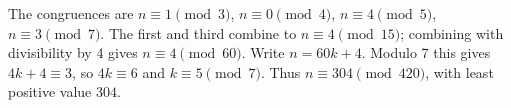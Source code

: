 The congruences are $n\equiv 1\pmod 3$, $n\equiv 0\pmod 4$, $n\equiv 4\pmod 5$, $n\equiv 3\pmod 7$. The first and third combine to $n\equiv 4\pmod{15}$; combining with divisibility by 4 gives $n\equiv 4\pmod{60}$. Write $n=60k+4$. Modulo 7 this gives $4k+4\equiv 3$, so $4k\equiv 6$ and $k\equiv 5\pmod 7$. Thus $n\equiv 304\pmod{420}$, with least positive value $\boxed{304}$.
